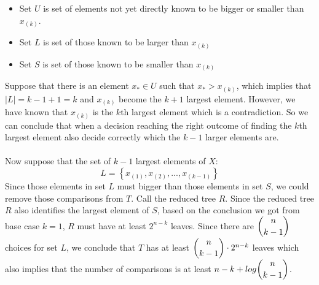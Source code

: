 \begin{itemize}
	\item Set $U$ is set of elements not yet directly known to be bigger or smaller than $x_{(k)}$.
	\item Set $L$ is set of those known to be larger than $x_{(k)}$
	\item Set $S$ is set of those known to be smaller than $x_{(k)}$
\end{itemize}
Suppose that there is an element $x_* \in U$ such that $x_* > x_{(k)}$, which implies that $\mid L \mid = k - 1 + 1 = k$ and $x_{(k)}$ become the $k + 1$ largest element. However, we have known that $x_{(k)}$ is the $k$th largest element which is a contradiction. So we can conclude that when a decision reaching the right outcome of finding the $k$th largest element also decide correctly which the $k - 1$ larger elements are.\\\\
Now suppose that the set of $k - 1$ largest elements of $X$:
$$ L = \left\{x_{(1)}, x_{(2)}, ... ,x_{(k-1)}\right\} $$  
Since those elements in set $L$ must bigger than those elements in set $S$, we could remove those comparisons from $T$. Call the reduced tree $R$. Since the reduced tree $R$ also identifies the largest element of $S$, based on the conclusion we got from base case $k = 1$, $R$ must have at least $2^{n - k}$ leaves. Since there are $\dbinom{n}{k - 1}$ choices for set $L$, we conclude that $T$ has at least $\dbinom{n}{k - 1} \cdot 2^{n - k}$ leaves which also implies that the number of comparisons is at least $n - k + log\dbinom{n}{k - 1}$. 







